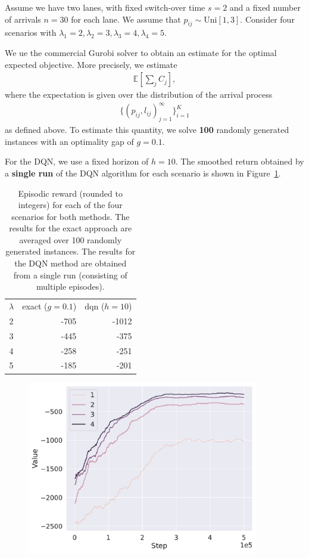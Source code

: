 \documentclass{article}
\theoremstyle{definition}
\theoremstyle{plain}
\begin{document}
Assume we have two lanes, with fixed switch-over time $s=2$ and a fixed number
of arrivals $n=30$ for each lane. We assume that $p_{ij} \sim \text{Uni}[1, 3]$.
Consider four scenarios with
$\lambda_{1} = 2, \lambda_{2} = 3, \lambda_{3} = 4, \lambda_{4} = 5$.

We ue the commercial Gurobi solver to obtain an estimate for the optimal
expected objective. More precisely, we estimate
\begin{align}
\mathbb{E}\left[ \sum_{j} C_{j} \right] ,
\end{align}
where the expectation is given over the distribution of the arrival process
\begin{align}
\{(p_{ij}, l_{ij})_{j=1}^{\infty}\}_{i=1}^{K}
\end{align}
as defined above. To estimate this quantity, we solve \textbf{100} randomly generated
instances with an optimality gap of $g = 0.1$.

For the DQN, we use a fixed horizon of $h = 10$. The smoothed return obtained by
a \textbf{single run} of the DQN algorithm for each scenario is shown in
Figure~\ref{fig:dqn-learning-rates}.

\begin{table}
  \centering
\begin{tabular}{|c|r|r|}
  $\lambda$ & exact ($g=0.1$) & dqn ($h=10$) \\
  \cline{1-3}
  2 & -705 & -1012 \\
  3 & -445 & -375 \\
  4 & -258 & -251 \\
  5 & -185 & -201
\end{tabular}
\caption{Episodic reward (rounded to integers) for each of the four scenarios
  for both methods. The results for the exact approach are averaged over 100
  randomly generated instances. The results for the DQN method are obtained from
  a single run (consisting of multiple episodes).}
\end{table}

\begin{figure}
  \centering
  \includegraphics[width=0.9\textwidth]{../single-intersection/comparison.pdf}
  \label{fig:dqn-learning-rates}
\end{figure}

% 
% 
\end{document}
